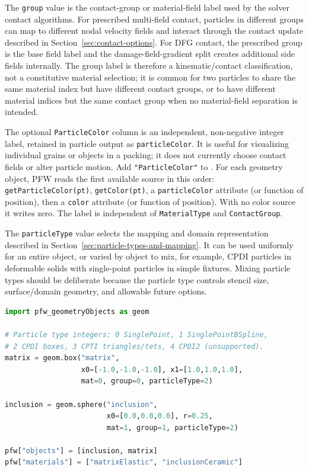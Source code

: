 The \texttt{group} value is the contact-group or material-field label used by the solver contact algorithms.  For prescribed multi-field contact, particles in different groups can map to different nodal velocity fields and interact through the contact update described in Section~\ref{sec:contact-options}.  For DFG contact, the prescribed group is the base field label and the damage-field-gradient split creates additional side fields internally.  The group label is therefore a kinematic/contact classification, not a constitutive material selection; it is common for two particles to share the same material index but have different contact groups, or to have different material indices but the same contact group when no material-field separation is intended.

The optional \texttt{ParticleColor} column is an independent, non-negative integer label, retained in particle output as \texttt{particleColor}. It is useful for visualizing individual grains or objects in a packing; it does not currently choose contact fields or alter particle motion. Add \texttt{"ParticleColor"} to . For each geometry object, PFW reads the first available source in this order: \texttt{getParticleColor(pt)}, \texttt{getColor(pt)}, a \texttt{particleColor} attribute (or function of position), then a \texttt{color} attribute (or function of position). With no color source it writes zero. The label is independent of \texttt{MaterialType} and \texttt{ContactGroup}.


The \texttt{particleType} value selects the mapping and domain representation described in Section~\ref{sec:particle-types-and-mapping}.  It can be used uniformly for an entire object, or varied by object to mix, for example, CPDI particles in deformable solids with single-point particles in simple fixtures.  Mixing particle types should be deliberate because the particle type controls stencil size, surface/domain geometry, and allowable future options.

\begin{lstlisting}[language=Python,caption={Constant material, group, and particle-type assignments on geometry objects.}]
import pfw_geometryObjects as geom

# Particle type integers: 0 SinglePoint, 1 SinglePointBSpline,
# 2 CPDI boxes, 3 CPTI triangles/tets, 4 CPDI2 (unsupported).
matrix = geom.box("matrix",
                  x0=[-1.0,-1.0,-1.0], x1=[1.0,1.0,1.0],
                  mat=0, group=0, particleType=2)

inclusion = geom.sphere("inclusion",
                        x0=[0.0,0.0,0.0], r=0.25,
                        mat=1, group=1, particleType=2)

pfw["objects"] = [inclusion, matrix]
pfw["materials"] = ["matrixElastic", "inclusionCeramic"]
\end{lstlisting}


